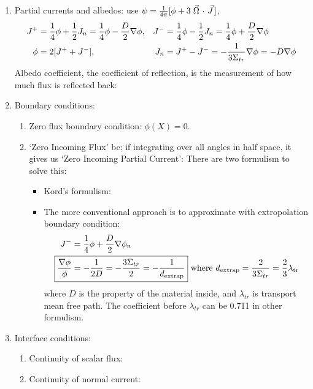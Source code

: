 \documentclass{school-22.211-notes}
\begin{document}
\begin{enumerate}
\item Partial currents and albedos: use $\psi = \frac{1}{4\pi} [\phi + 3 \left.\vec{\Omega}\right. \cdot \left.\vec{J}\right.]$, 
  \begin{align}
    J^+ &= \frac{1}{4} \phi + \frac{1}{2} J_n = \frac{1}{4} \phi - \frac{D}{2} \nabla \phi, & J^- &= \frac{1}{4} \phi - \frac{1}{2} J_n = \frac{1}{4} \phi + \frac{D}{2} \nabla \phi \\
    \phi &= 2[J^+ + J^-], & J_n &= J^+ - J^- =  -\frac{1}{3 \Sigma_{tr}} \nabla \phi  = - D \nabla \phi
  \end{align}
  Albedo coefficient, the coefficient of reflection, is the measurement of how much flux is reflected back: 
  
\item Boundary conditions:
  \begin{enumerate}
  \item Zero flux boundary condition: $\phi(X) = 0$. 
  \item `Zero Incoming Flux' bc; if integrating over all angles in half space, it gives us `Zero Incoming Partial Current':
    There are two formulism to solve this:
    \begin{itemize}
    \item Kord's formulism: 
    \item The more conventional approach is to approximate with extropolation boundary condition: 
      \begin{align}
        J^- &= \frac{1}{4} \phi + \frac{D}{2} \gradient \phi_n \\
        \Aboxed{ \frac{\gradient \phi}{\phi} &= - \frac{1}{2D} = - \frac{3\Sigma_{tr}}{2} = - \frac{1}{d_{\mathrm{extrap}}}} 
        \mbox{   where } d_{\mathrm{extrap}} = \frac{2}{3 \Sigma_{tr}}  = \frac{2}{3} \lambda_{\mathrm{tr}}
      \end{align}
      where $D$ is the property of the material inside, and $\lambda_{tr}$ is transport mean free path. The coefficient before $\lambda_{tr}$ can be 0.711 in other formulism. 
    \end{itemize}
  \end{enumerate}

\item Interface conditions: 
  \begin{enumerate}
    \item Continuity of scalar flux: 
    \item Continuity of normal current:
  \end{enumerate}
\end{enumerate}
\end{document}
